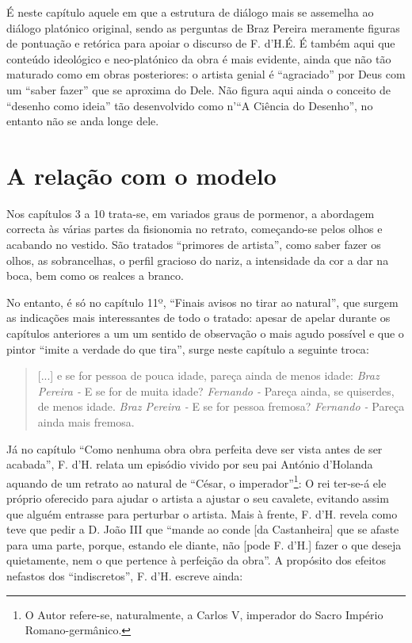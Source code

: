 \documentclass{article}
\begin{document}
É neste capítulo aquele em que a estrutura de diálogo mais se
assemelha ao diálogo platónico original, sendo as perguntas de Braz
Pereira meramente figuras de pontuação e retórica para apoiar o
discurso de F. d'H.É. É também aqui que conteúdo ideológico e
neo-platónico da obra é mais evidente, ainda que não tão maturado como
em obras posteriores: o artista genial é ``agraciado'' por Deus com um
``saber fazer'' que se aproxima do Dele\cite[p.14]{holanda}. Não
figura aqui ainda o conceito de ``desenho como ideia'' tão
desenvolvido como n'``A Ciência do Desenho''\cite{holanda-desenho}, no
entanto não se anda longe dele.

\section{A relação com o modelo}

Nos capítulos 3 a 10 trata-se, em variados graus de pormenor, a
abordagem correcta às várias partes da fisionomia no retrato,
começando-se pelos olhos e acabando no vestido. São tratados
``primores de artista'', como saber fazer os olhos, as sobrancelhas, o
perfil gracioso do nariz, a intensidade da cor a dar na boca, bem como
os realces a branco.

No entanto, é só no capítulo 11º, ``Finais avisos no tirar ao
natural'', que surgem as indicações mais interessantes de todo o
tratado: apesar de apelar durante os capítulos anteriores a um um
sentido de observação o mais agudo possível e que o pintor ``imite a
verdade do que tira''\cite[p.31]{holanda}, surge neste capítulo a
seguinte troca\cite[p.39]{holanda}:

\begin{quote}
  [...] e se for pessoa de pouca idade, pareça ainda de menos idade:
  \emph{Braz Pereira -}  E se for de muita idade?
  \emph{Fernando -}  Pareça ainda, se quiserdes, de menos idade.
  \emph{Braz Pereira -}  E se for pessoa fremosa?
  \emph{Fernando -}  Pareça ainda mais fremosa.
\end{quote}

Já no capítulo ``Como nenhuma obra obra perfeita deve ser vista antes
de ser acabada'', F. d'H. relata um episódio vivido por seu pai
António d'Holanda aquando de um retrato ao natural de ``César, o
imperador''\footnote{O Autor refere-se, naturalmente, a Carlos V,
  imperador do Sacro Império Romano-germânico.}\cite[p.17]{holanda}: O
rei ter-se-á ele próprio oferecido para ajudar o artista a ajustar o
seu cavalete, evitando assim que alguém entrasse para perturbar o
artista. Mais à frente, F. d'H. revela como teve que pedir a D. João
III que ``mande ao conde [da Castanheira] que se afaste para uma
parte, porque, estando ele diante, não [pode F. d'H.] fazer o que
deseja quietamente, nem o que pertence à perfeição da obra''. A
propósito dos efeitos nefastos dos ``indiscretos'', F. d'H. escreve
ainda\cite[p.18]{holanda}:
\end{document}
